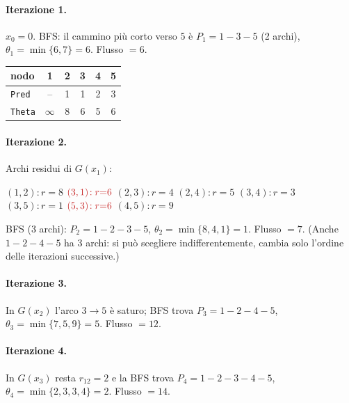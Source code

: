 \documentclass[11pt,a4paper]{article}
\newcommand{\rdm}[3]{\mbox{$(#1,#2)\!:r{=}#3$}\hspace{1.1em}}
\newcommand{\rim}[3]{\mbox{$\textcolor{neg}{(#1,#2)\!:r{=}#3}$}\hspace{1.1em}}
\newenvironment{resid}{\par\smallskip\noindent\small\raggedright\ignorespaces}{\par\smallskip\noindent}
\begin{document}
\begin{center}
\end{center}

\begin{sol}
\paragraph{Iterazione 1.} $x_0=0$. BFS: il cammino più corto verso $5$ è
$P_1=1\!-\!3\!-\!5$ (2 archi), $\theta_1=\min\{6,7\}=6$. Flusso $=6$.

\begin{center}\small
\begin{tabular}{@{}l|ccccc@{}}
\toprule
nodo & 1 & 2 & 3 & 4 & 5\\
\midrule
\texttt{Pred} & -- & 1 & 1 & 2 & 3\\
\texttt{Theta} & $\infty$ & 8 & 6 & 5 & 6\\
\bottomrule
\end{tabular}
\end{center}

\paragraph{Iterazione 2.} Archi residui di $G(x_1)$:
\begin{resid}
\rdm{1}{2}{8} \rim{3}{1}{6} \rdm{2}{3}{4} \rdm{2}{4}{5} \rdm{3}{4}{3}
\rdm{3}{5}{1} \rim{5}{3}{6} \rdm{4}{5}{9}
\end{resid}
BFS (3 archi): $P_2=1\!-\!2\!-\!3\!-\!5$, $\theta_2=\min\{8,4,1\}=1$. Flusso $=7$.
(Anche $1\!-\!2\!-\!4\!-\!5$ ha 3 archi: si può scegliere indifferentemente, cambia solo
l'ordine delle iterazioni successive.)

\paragraph{Iterazione 3.} In $G(x_2)$ l'arco $3\to5$ è saturo; BFS trova
$P_3=1\!-\!2\!-\!4\!-\!5$, $\theta_3=\min\{7,5,9\}=5$. Flusso $=12$.

\paragraph{Iterazione 4.} In $G(x_3)$ resta $r_{12}=2$ e la BFS trova
$P_4=1\!-\!2\!-\!3\!-\!4\!-\!5$, $\theta_4=\min\{2,3,3,4\}=2$. Flusso $=14$.


\end{sol}
\end{document}
